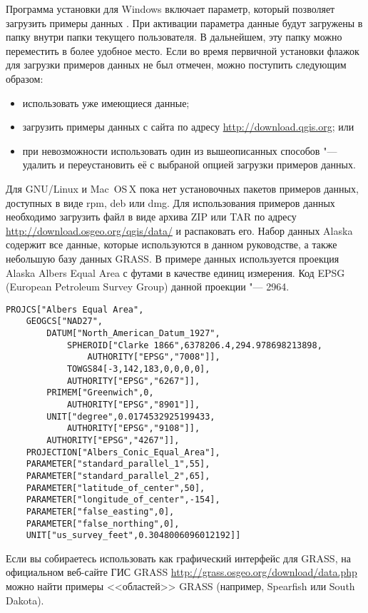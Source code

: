 \win Программа установки для Windows включает параметр, который позволяет
загрузить примеры данных \qg. При активации параметра данные будут загружены в папку
 внутри папки 
текущего пользователя. В дальнейшем, эту папку можно переместить в более
удобное место. Если во время первичной установки \qg флажок для загрузки
примеров данных не был отмечен, можно поступить следующим образом:
\begin{itemize}[label=--]
\item использовать уже имеющиеся данные;
\item загрузить примеры данных с сайта \qg по адресу \url{http://download.qgis.org}; или
\item при невозможности использовать один из вышеописанных способов "---
удалить \qg и переустановить её с выбраной опцией загрузки примеров данных.
\end{itemize}

\nix \osx Для GNU/Linux и Mac~OS\,X пока нет установочных пакетов
примеров данных, доступных в виде rpm, deb или dmg. Для использования
примеров данных необходимо загрузить файл 
в виде архива ZIP или TAR по адресу
\url{http://download.osgeo.org/qgis/data/} и распаковать его. Набор
данных Alaska содержит все данные, которые используются в данном руководстве,
а также небольшую базу данных GRASS. В примере данных используется
проекция Alaska Albers Equal Area с футами в качестве единиц измерения.
Код EPSG (European Petroleum Survey Group) данной проекции "--- 2964.

\begin{verbatim}
PROJCS["Albers Equal Area",
    GEOGCS["NAD27",
        DATUM["North_American_Datum_1927",
            SPHEROID["Clarke 1866",6378206.4,294.978698213898,
                AUTHORITY["EPSG","7008"]],
            TOWGS84[-3,142,183,0,0,0,0],
            AUTHORITY["EPSG","6267"]],
        PRIMEM["Greenwich",0,
            AUTHORITY["EPSG","8901"]],
        UNIT["degree",0.0174532925199433,
            AUTHORITY["EPSG","9108"]],
        AUTHORITY["EPSG","4267"]],
    PROJECTION["Albers_Conic_Equal_Area"],
    PARAMETER["standard_parallel_1",55],
    PARAMETER["standard_parallel_2",65],
    PARAMETER["latitude_of_center",50],
    PARAMETER["longitude_of_center",-154],
    PARAMETER["false_easting",0],
    PARAMETER["false_northing",0],
    UNIT["us_survey_feet",0.3048006096012192]]
\end{verbatim}

Если вы собираетесь использовать \qg как графический интерфейс для
GRASS, на официальном веб-сайте ГИС GRASS
\url{http://grass.osgeo.org/download/data.php} можно найти примеры
<<областей>> GRASS (например, Spearfish или South Dakota).

